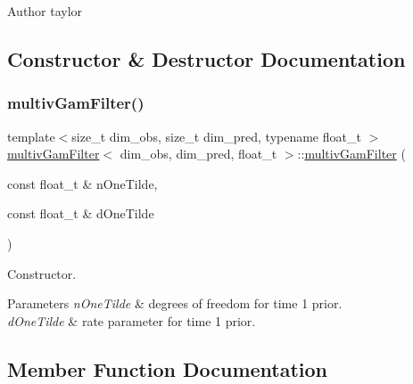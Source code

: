 \begin{DoxyAuthor}{Author}
taylor 
\end{DoxyAuthor}


\subsection{Constructor \& Destructor Documentation}
\mbox{\label{classmultivGamFilter_a31e576702f6e72f43744d453b2bc6329}} 
\subsubsection{\texorpdfstring{multiv\+Gam\+Filter()}{multivGamFilter()}}
{\footnotesize\ttfamily template$<$size\+\_\+t dim\+\_\+obs, size\+\_\+t dim\+\_\+pred, typename float\+\_\+t $>$ \\
\hyperlink{classmultivGamFilter}{multiv\+Gam\+Filter}$<$ dim\+\_\+obs, dim\+\_\+pred, float\+\_\+t $>$\+::\hyperlink{classmultivGamFilter}{multiv\+Gam\+Filter} (\begin{DoxyParamCaption}\item[{const float\+\_\+t \&}]{n\+One\+Tilde,  }\item[{const float\+\_\+t \&}]{d\+One\+Tilde }\end{DoxyParamCaption})}



Constructor. 


\begin{DoxyParams}{Parameters}
{\em n\+One\+Tilde} & degrees of freedom for time 1 prior. \\
\hline
{\em d\+One\+Tilde} & rate parameter for time 1 prior. \\
\hline
\end{DoxyParams}


\subsection{Member Function Documentation}
\mbox{\label{classmultivGamFilter_a5cdc2917399fed956b44f69002cae8c3}} 
